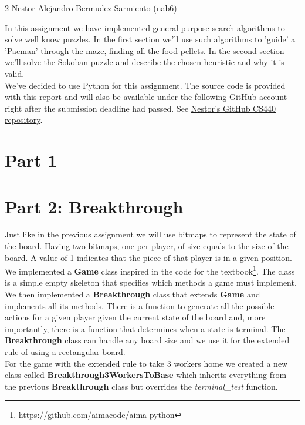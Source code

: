 \documentclass[11pt]{article}
\begin{document}
\homework
    {2}
    {Nestor Alejandro Bermudez Sarmiento (nab6)}
    {}

In this assignment we have implemented general-purpose search algorithms to solve well know puzzles. In the first section we'll use such algorithms to 'guide' a 'Pacman' through the maze, finding all the food pellets. In the second section we'll solve the Sokoban puzzle and describe the chosen heuristic and why it is valid.\\

We've decided to use Python for this assignment. The source code is provided with this report and will also be available under the following GitHub account right after the submission deadline had passed. See \href{https://github.com/nbermudezs/UIUC_CS440}{Nestor's GitHub CS440 repository}.\\

\section*{Part 1}

\pagebreak
\section*{Part 2: Breakthrough}
Just like in the previous assignment we will use bitmaps to represent the state of the board. Having two bitmaps, one per player, of size equals to the size of the board. A value of 1 indicates that the piece of that player is in a given position.\\

We implemented a \textbf{Game} class inspired in the code for the textbook\footnote{\url{https://github.com/aimacode/aima-python}}. The class is a simple empty skeleton that specifies which methods a game must implement. We then implemented a \textbf{Breakthrough} class that extends \textbf{Game} and implements all its methods. There is a function to generate all the possible actions for a given player given the current state of the board and, more importantly, there is a function that determines when a state is terminal. The \textbf{Breakthrough} class can handle any board size and we use it for the extended rule of using a rectangular board.\\

For the game with the extended rule to take 3 workers home we created a new class called \textbf{Breakthrough3WorkersToBase} which inherits everything from the previous \textbf{Breakthrough} class but overrides the \textit{terminal\_test} function.\\
\end{document}
